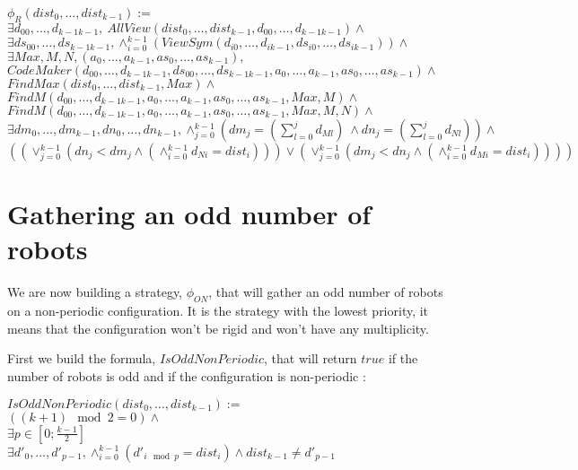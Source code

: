 \documentclass{article}
\begin{document}
\begin{center}
$\phi_R(dist_{0}, \ldots ,dist_{k-1}):=$\\
$\exists d_{00}, \ldots ,d_{k-1k-1},\ AllView(dist_{0}, \ldots ,dist_{k-1}, d_{00}, \ldots ,d_{k-1k-1})\land$\\
$\exists ds_{00}, \ldots ,ds_{k-1k-1}, \land_{i=0}^{k-1} (ViewSym(d_{i0}, \ldots , d_{ik-1}, ds_{i0}, \ldots , ds_{ik-1}))\land$\\
$\exists Max, M, N, (a_{0}, \ldots , a_{k-1}, as_{0}, \ldots , as_{k-1}),$\\
$CodeMaker(d_{00}, \ldots ,d_{k-1k-1}, ds_{00}, \ldots ,ds_{k-1k-1}, a_{0}, \ldots , a_{k-1}, as_{0}, \ldots , as_{k-1})\land$\\
$FindMax(dist_{0}, \ldots ,dist_{k-1}, Max) \land$\\
$FindM(d_{00}, \ldots ,d_{k-1k-1}, a_{0}, \ldots , a_{k-1}, as_{0}, \ldots , as_{k-1}, Max, M) \land $\\
$FindM(d_{00}, \ldots ,d_{k-1k-1}, a_{0}, \ldots , a_{k-1}, as_{0}, \ldots , as_{k-1}, Max, M, N) \land $\\
$\exists dm_{0}, \ldots , dm_{k-1}, dn_{0}, \ldots , dn_{k-1}, \land_{j=0}^{k-1}(dm_{j} = (\sum_{l=0}^j d_{Ml})\ 
\land dn_{j} = (\sum_{l=0}^j d_{Nl}) ) \land $\\
$((\lor_{j=0}^{k-1} (dn_{j} < dm_{j} \land (\land_{i=0}^{k-1} d_{Ni} = dist_{i}) ) ) \lor 
(\lor_{j=0}^{k-1} (dm_{j} < dn_{j} \land (\land_{i=0}^{k-1} d_{Mi} = dist_{i}) ) ) )$
\end{center}

\section{Gathering an odd number of robots}

We are now building a strategy, $\phi_{ON}$, that will gather an odd number of robots on a non-periodic configuration. It is the strategy with the lowest priority, it means that the configuration won't be rigid and won't have any multiplicity.

First we build the formula, $IsOddNonPeriodic$, that will return $true$ if the number of robots is odd and if the configuration is non-periodic :

\begin{center}
    
$IsOddNonPeriodic(dist_{0}, \ldots , dist_{k-1}):=$\\
$((k+1) \mod{2} = 0) \land $\\
$\exists p \in [0; \frac{k-1}{2}]$\\
$\exists d'_{0}, \ldots , d'_{p-1}, \land_{i=0}^{k-1} (d'_{i\mod{p}} = dist_{i}) \land dist_{k-1} \not= d'_{p-1}$
\end{center}
\end{document}
